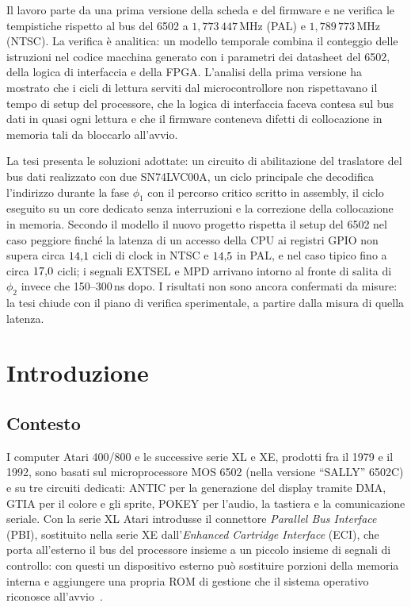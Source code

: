 \documentclass[11pt,a4paper,twoside,openright]{report}
\newcommand{\MHz}{\,\mathrm{MHz}}
\newcommand{\sig}[1]{\textsf{#1}}
\begin{document}
Il lavoro parte da una prima versione della scheda e del firmware e ne verifica le
tempistiche rispetto al bus del 6502 a $1{,}773\,447\MHz$ (PAL) e $1{,}789\,773\MHz$
(NTSC). La verifica è analitica: un modello temporale combina il conteggio delle istruzioni
nel codice macchina generato con i parametri dei datasheet del 6502, della logica di
interfaccia e della FPGA. L'analisi della prima versione ha mostrato che i cicli di lettura
serviti dal microcontrollore non rispettavano il tempo di setup del processore, che la logica
di interfaccia faceva contesa sul bus dati in quasi ogni lettura e che il firmware conteneva
difetti di collocazione in memoria tali da bloccarlo all'avvio.

La tesi presenta le soluzioni adottate: un circuito di abilitazione del traslatore del bus
dati realizzato con due SN74LVC00A, un ciclo principale che decodifica l'indirizzo
durante la fase $\phi_1$ con il percorso critico scritto in assembly, il ciclo eseguito su
un core dedicato senza interruzioni e la correzione della collocazione in memoria. Secondo
il modello il nuovo progetto rispetta il setup del 6502 nel caso peggiore finché la latenza
di un accesso della CPU ai registri GPIO non supera circa $14{,}1$ cicli di clock in
NTSC e $14{,}5$ in PAL, e nel caso tipico fino a circa $17{,}0$ cicli; i segnali
\sig{EXTSEL} e \sig{MPD} arrivano intorno al fronte di salita di $\phi_2$ invece che
150--300\,ns dopo. I risultati non sono ancora confermati da misure: la tesi chiude con il
piano di verifica sperimentale, a partire dalla misura di quella latenza.

\tableofcontents
\listoffigures
\listoftables

\cleardoublepage
{}

\chapter{Introduzione}
\label{cap:intro}

\section{Contesto}

I computer Atari 400/800 e le successive serie XL e XE, prodotti fra il 1979 e il 1992,
sono basati sul microprocessore MOS 6502 (nella versione \enquote{SALLY} 6502C) e su tre
circuiti dedicati: ANTIC per la generazione del display tramite DMA, GTIA per il colore e
gli sprite, POKEY per l'audio, la tastiera e la comunicazione seriale. Con la serie XL
Atari introdusse il connettore \emph{Parallel Bus Interface} (PBI), sostituito nella serie
XE dall'\emph{Enhanced Cartridge Interface} (ECI), che porta all'esterno il bus del
processore insieme a un piccolo insieme di segnali di controllo: con questi un dispositivo
esterno può sostituire porzioni della memoria interna e aggiungere una propria ROM di
gestione che il sistema operativo riconosce all'avvio~\cite{ahrm}.
\end{document}
